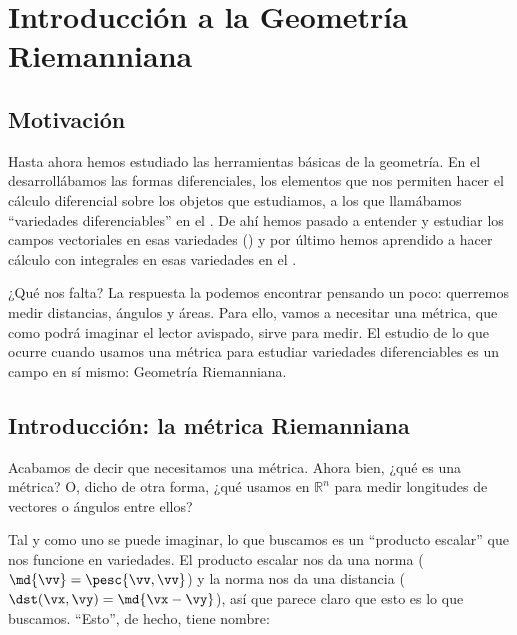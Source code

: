 \chapter{Introducción a la Geometría Riemanniana}
\label{chap:GeometriaRiemman}

\section{Motivación}

Hasta ahora hemos estudiado las herramientas básicas de la geometría. En el  desarrollábamos las formas diferenciales, los elementos que nos permiten hacer el cálculo diferencial sobre los objetos que estudiamos, a los que llamábamos ``variedades diferenciables'' en el . De ahí hemos pasado a entender y estudiar los campos vectoriales en esas variedades () y por último hemos aprendido a hacer cálculo con integrales en esas variedades en el .

¿Qué nos falta? La respuesta la podemos encontrar pensando un poco: querremos medir distancias, ángulos y áreas. Para ello, vamos a necesitar una métrica, que como podrá imaginar el lector avispado, sirve para medir. El estudio de lo que ocurre cuando usamos una métrica para estudiar variedades diferenciables es un campo en sí mismo: Geometría Riemanniana.

\section{Introducción: la métrica Riemanniana}

Acabamos de decir que necesitamos una métrica. Ahora bien, ¿qué es una métrica? O, dicho de otra forma, ¿qué usamos en $ℝ^n$ para medir longitudes de vectores o ángulos entre ellos?

Tal y como uno se puede imaginar, lo que buscamos es un ``producto escalar'' que nos funcione en variedades. El producto escalar nos da una norma ($\md{\vv} = \pesc{\vv, \vv}$) y la norma nos da una distancia ($\dst(\vx, \vy) = \md{\vx - \vy}$), así que parece claro que esto es lo que buscamos. ``Esto'', de hecho, tiene nombre:

